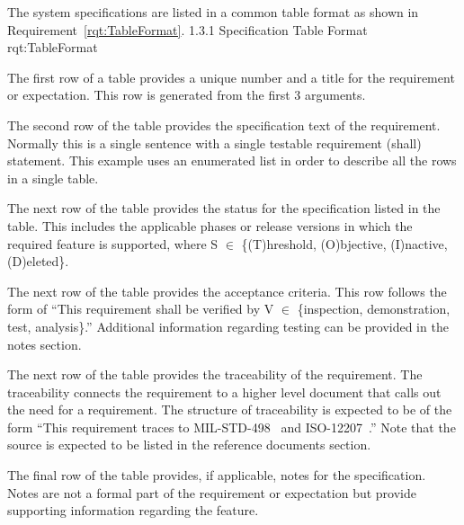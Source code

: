 The system specifications are listed in a common table format as shown in Requirement~\ref{rqt:TableFormat}.
\ONERQMT
{1.3.1}
{Specification Table Format}
{rqt:TableFormat}
{
\begin{my_enumerate}
	\item The first row of a table provides a unique number and a title for the requirement or expectation. This row is generated from the first 3 arguments.

	\item The second row of the table provides the specification text of the requirement. Normally this is a single sentence with a single testable requirement (shall) statement. This example uses an enumerated list in order to describe all the rows in a single table.

	\item The next row of the table provides the status for the specification listed in the table. This includes the applicable phases or release versions in which the required feature is supported, where S $\in$ \{(T)hreshold, (O)bjective, (I)nactive, (D)eleted\}.
  
	\item The next row of the table provides the acceptance criteria. This row follows the form of ``This requirement shall be verified by V $\in$ \{inspection, demonstration, test, analysis\}.'' Additional information regarding testing can be provided in the notes section.

	\item The next row of the table provides the traceability of the requirement. The traceability connects the requirement to a higher level document that calls out the need for a requirement. The structure of traceability is expected to be of the form ``This requirement traces to MIL-STD-498~\cite{ref__MIL_STD_498} and ISO-12207~\cite{ref__ISO_12207}.'' Note that the source is expected to be listed in the reference documents section.

	\item The final row of the table provides, if applicable, notes for the specification. Notes are not a formal part of the requirement or expectation but provide supporting information regarding the feature.
 \end{my_enumerate}
}
